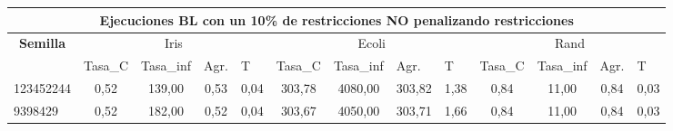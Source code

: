 \documentclass[12pt, spanish]{article}
\begin{document}
\begin{table}[H]
\small

\begin{adjustwidth}{-1cm}{-1cm}%

\begin{tabular}{|l|c|c|c|c|c|c|c|c|c|c|c|c|}
\hline
\multicolumn{13}{|c|}{\textbf{Ejecuciones BL con un 10\% de restricciones NO penalizando restricciones}}                                                                                                                                                                                                                                                                                                               \\ \hline
\multicolumn{1}{|c|}{\multirow{2}{*}{\textbf{Semilla}}} & \multicolumn{4}{c|}{Iris}                                                                                          & \multicolumn{4}{c|}{Ecoli}                                                                                         & \multicolumn{4}{c|}{Rand}                                                                                          \\ \cline{2-13} 
\multicolumn{1}{|c|}{}                                  & \multicolumn{1}{l|}{Tasa\_C} & \multicolumn{1}{l|}{Tasa\_inf} & \multicolumn{1}{l|}{Agr.} & \multicolumn{1}{l|}{T} & \multicolumn{1}{l|}{Tasa\_C} & \multicolumn{1}{l|}{Tasa\_inf} & \multicolumn{1}{l|}{Agr.} & \multicolumn{1}{l|}{T} & \multicolumn{1}{l|}{Tasa\_C} & \multicolumn{1}{l|}{Tasa\_inf} & \multicolumn{1}{l|}{Agr.} & \multicolumn{1}{l|}{T} \\ \hline
123452244                                               & 0,52                         & 139,00                         & 0,53                      & 0,04                   & 303,78                       & 4080,00                        & 303,82                    & 1,38                   & 0,84                         & 11,00                          & 0,84                      & 0,03                   \\ \hline
9398429                                                 & 0,52                         & 182,00                         & 0,52                      & 0,04                   & 303,67                       & 4050,00                        & 303,71                    & 1,66                   & 0,84                         & 11,00                          & 0,84                      & 0,03                   \\ \hline

\end{tabular}
\end{adjustwidth}
\end{table}
\end{document}
